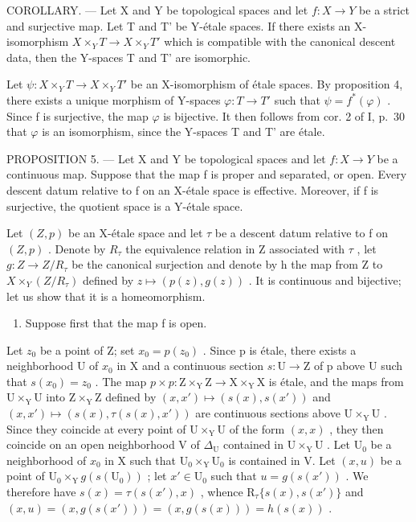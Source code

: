 COROLLARY. --- Let X and Y be topological spaces and let \(f: X \rightarrow Y\) be a strict and surjective map. Let T and T' be Y-étale spaces. If there exists an X-isomorphism \(X \times_{Y} T \rightarrow X \times_{Y} T'\) which is compatible with the canonical descent data, then the Y-spaces T and T' are isomorphic.

Let \(\psi\colon X\times_{Y}T\to X\times_{Y}T'\) be an X-isomorphism of étale spaces. By proposition 4, there exists a unique morphism of Y-spaces \(\varphi\colon T \to T'\) such that \(\psi = f^{*}(\varphi)\) . Since f is surjective, the map \(\varphi\) is bijective. It then follows from cor. 2 of I, p.~30 that \(\varphi\) is an isomorphism, since the Y-spaces T and T' are étale.

PROPOSITION 5. --- Let X and Y be topological spaces and let \(f: X \to Y\) be a continuous map. Suppose that the map f is proper and separated, or open. Every descent datum relative to f on an X-étale space is effective. Moreover, if f is surjective, the quotient space is a Y-étale space.

Let \((Z,p)\) be an X-étale space and let \(\tau\) be a descent datum relative to f on \((Z,p)\) . Denote by \(R_{\tau}\) the equivalence relation in Z associated with \(\tau\) , let \(g: Z \to Z/R_{\tau}\) be the canonical surjection and denote by h the map from Z to \(X \times_{Y} (Z/R_{\tau})\) defined by \(z \mapsto (p(z), g(z))\) . It is continuous and bijective; let us show that it is a homeomorphism.

\begin{enumerate}
\def\labelenumi{\alph{enumi})}
\tightlist
\item
  Suppose first that the map f is open.
\end{enumerate}

Let \(z_0\) be a point of Z; set \(x_0 = p(z_0)\) . Since p is étale, there exists a neighborhood U of \(x_0\) in X and a continuous section \(s: \mathrm{U} \to \mathrm{Z}\) of p above U such that \(s(x_0) = z_0\) . The map \(p \times p: \mathrm{Z} \times_{\mathrm{Y}} \mathrm{Z} \to \mathrm{X} \times_{\mathrm{Y}} \mathrm{X}\) is étale, and the maps from \(\mathrm{U} \times_{\mathrm{Y}} \mathrm{U}\) into \(\mathrm{Z} \times_{\mathrm{Y}} \mathrm{Z}\) defined by \((x, x') \mapsto (s(x), s(x'))\) and \((x, x') \mapsto (s(x), \tau(s(x), x'))\) are continuous sections above \(\mathrm{U} \times_{\mathrm{Y}} \mathrm{U}\) . Since they coincide at every point of \(\mathrm{U} \times_{\mathrm{Y}} \mathrm{U}\) of the form \((x, x)\) , they then coincide on an open neighborhood V of \(\Delta_{\mathrm{U}}\) contained in \(\mathrm{U} \times_{\mathrm{Y}} \mathrm{U}\) . Let \(\mathrm{U}_0\) be a neighborhood of \(x_0\) in X such that \(\mathrm{U}_0 \times_{\mathrm{Y}} \mathrm{U}_0\) is contained in V. Let \((x, u)\) be a point of \(\mathrm{U}_0 \times_{\mathrm{Y}} g(s(\mathrm{U}_0))\) ; let \(x' \in \mathrm{U}_0\) such that \(u = g(s(x'))\) . We therefore have \(s(x) = \tau(s(x'), x)\) , whence \(\mathrm{R}_{\tau}\{s(x), s(x')\}\) and \((x, u) = (x, g(s(x'))) = (x, g(s(x))) = h(s(x))\) .


